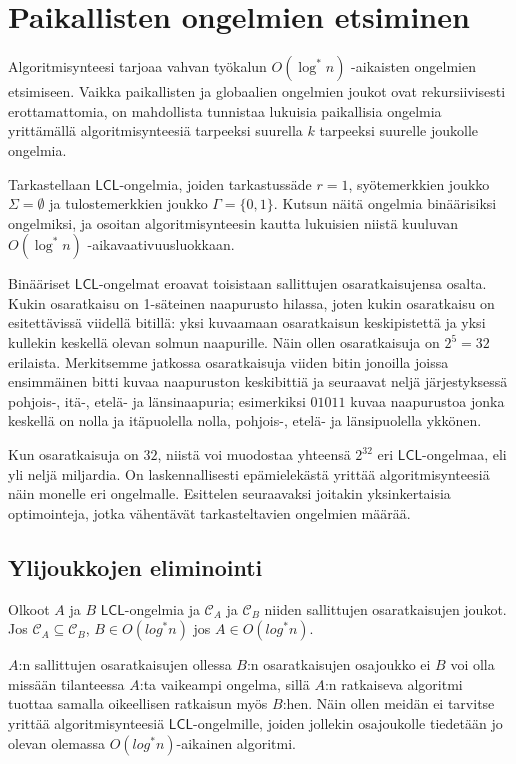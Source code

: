 \documentclass[12pt,finnish]{tktltiki2}
\theoremstyle{definition}
\theoremstyle{remark}
\newcommand*{\lcl}{\ensuremath{\mathsf{LCL}}}
\begin{document}
\section{Paikallisten ongelmien etsiminen}
Algoritmisynteesi tarjoaa vahvan työkalun $O(\log^* n)$ -aikaisten ongelmien etsimiseen. Vaikka paikallisten ja globaalien ongelmien joukot ovat rekursiivisesti erottamattomia, on mahdollista tunnistaa lukuisia paikallisia ongelmia yrittämällä algoritmisynteesiä tarpeeksi suurella $k$ tarpeeksi suurelle joukolle ongelmia.



Tarkastellaan \lcl -ongelmia, joiden tarkastussäde $r = 1$, syötemerkkien joukko $\Sigma = \emptyset$ ja tulostemerkkien joukko $\Gamma = \{0, 1\}$. Kutsun näitä ongelmia binäärisiksi ongelmiksi, ja osoitan algoritmisynteesin kautta lukuisien niistä kuuluvan $O(\log^* n)$ -aikavaativuusluokkaan.

Binääriset \lcl -ongelmat eroavat toisistaan sallittujen osaratkaisujensa osalta. Kukin osaratkaisu on 1-säteinen naapurusto hilassa, joten kukin osaratkaisu on esitettävissä viidellä bitillä: yksi kuvaamaan osaratkaisun keskipistettä ja yksi kullekin keskellä olevan solmun naapurille. Näin ollen osaratkaisuja on $2^5 = 32$ erilaista. Merkitsemme jatkossa osaratkaisuja viiden bitin jonoilla joissa ensimmäinen bitti kuvaa naapuruston keskibittiä ja seuraavat neljä järjestyksessä pohjois-, itä-, etelä- ja länsinaapuria; esimerkiksi $01011$ kuvaa naapurustoa jonka keskellä on nolla ja itäpuolella nolla, pohjois-, etelä- ja länsipuolella ykkönen.

Kun osaratkaisuja on $32$, niistä voi muodostaa yhteensä $2^{32}$ eri \lcl -ongelmaa, eli yli neljä miljardia. On laskennallisesti epämielekästä yrittää algoritmisynteesiä näin monelle eri ongelmalle. Esittelen seuraavaksi joitakin yksinkertaisia optimointeja, jotka vähentävät tarkasteltavien ongelmien määrää.

\subsection{Ylijoukkojen eliminointi}
Olkoot $A$ ja $B$ \lcl -ongelmia ja $\mathcal{C}_A$ ja $\mathcal{C}_B$  niiden sallittujen osaratkaisujen joukot. Jos $\mathcal{C}_A \subseteq \mathcal{C}_B$, $B \in O(log^* n)$ jos $A \in O(log^* n)$.

$A$:n sallittujen osaratkaisujen ollessa $B$:n osaratkaisujen osajoukko ei $B$ voi olla missään tilanteessa $A$:ta vaikeampi ongelma, sillä $A$:n ratkaiseva algoritmi tuottaa samalla oikeellisen ratkaisun myös $B$:hen. Näin ollen meidän ei tarvitse yrittää algoritmisynteesiä \lcl -ongelmille, joiden jollekin osajoukolle tiedetään jo olevan olemassa $O(log^* n)$-aikainen algoritmi.
\end{document}
